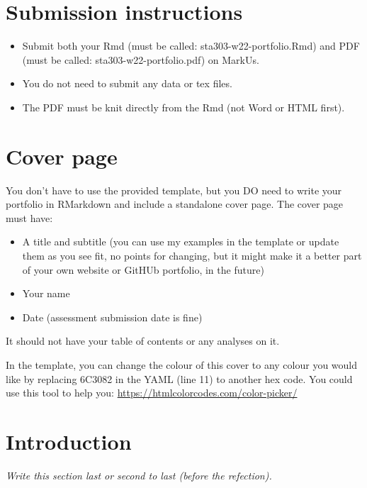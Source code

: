 \documentclass[
  openany]{book}
\providecommand{\tightlist}{%
  \setlength{\itemsep}{0pt}\setlength{\parskip}{0pt}}
\begin{document}
\hypertarget{submission-instructions-1}{%
\section{Submission instructions}\label{submission-instructions-1}}

\begin{itemize}
\tightlist
\item
  Submit both your Rmd (must be called: sta303-w22-portfolio.Rmd) and PDF (must be called: sta303-w22-portfolio.pdf) on MarkUs.
\item
  You do not need to submit any data or tex files.
\item
  The PDF must be knit directly from the Rmd (not Word or HTML first).
\end{itemize}

\hypertarget{cover-page-1}{%
\section{Cover page}\label{cover-page-1}}

You don't have to use the provided template, but you DO need to write your portfolio in RMarkdown and include a standalone cover page. The cover page must have:

\begin{itemize}
\item
  A title and subtitle (you can use my examples in the template or update them as you see fit, no points for changing, but it might make it a better part of your own website or GitHUb portfolio, in the future)
\item
  Your name
\item
  Date (assessment submission date is fine)
\end{itemize}

It should not have your table of contents or any analyses on it.

In the template, you can change the colour of this cover to any colour you would like by replacing 6C3082 in the YAML (line 11) to another hex code. You could use this tool to help you: \url{https://htmlcolorcodes.com/color-picker/}

\hypertarget{introduction-1}{%
\section{Introduction}\label{introduction-1}}

\emph{Write this section last or second to last (before the refection).}
\end{document}
